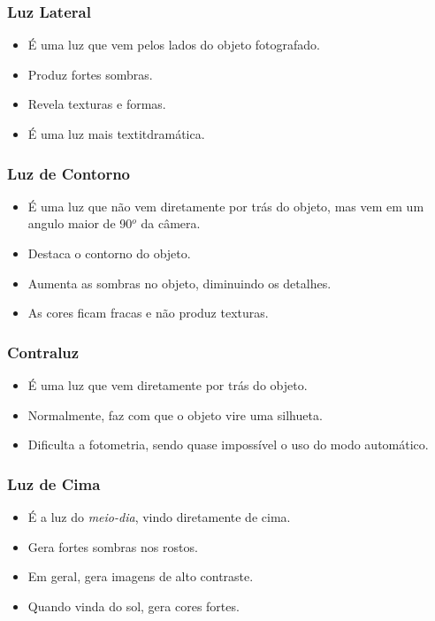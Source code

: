 \begin{frame}
  \frametitle{Luz Lateral}
  \begin{itemize}
    \item É uma luz que vem pelos lados do objeto fotografado.
    \item Produz fortes sombras.
    \item Revela texturas e formas.
    \item É uma luz mais textit{dramática}.
  \end{itemize}
\end{frame}


\begin{frame}
  \frametitle{Luz de Contorno}
  \begin{itemize}
    \item É uma luz que não vem diretamente por trás do objeto, mas vem em um angulo maior de 90$^o$ da câmera.
    \item Destaca o contorno do objeto.
    \item Aumenta as sombras no objeto, diminuindo os detalhes.
    \item As cores ficam fracas e não produz texturas.
  \end{itemize}
\end{frame}


\begin{frame}
  \frametitle{Contraluz}
  \begin{itemize}
    \item É uma luz que vem diretamente por trás do objeto.
    \item Normalmente, faz com que o objeto vire uma silhueta.
    \item Dificulta a fotometria, sendo quase impossível o uso do modo automático.
  \end{itemize}
\end{frame}




\begin{frame}
  \frametitle{Luz de Cima}
  \begin{itemize}
    \item É a luz do \textit{meio-dia}, vindo diretamente de cima.
    \item Gera fortes sombras nos rostos.
    \item Em geral, gera imagens de alto contraste.
    \item Quando vinda do sol, gera cores fortes.
  \end{itemize}
\end{frame}

